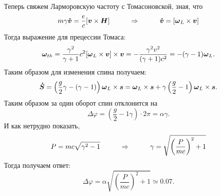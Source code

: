 Теперь свяжем Ларморовскую частоту с Томасоновской, зная, что 
\begin{equation*}
	m \gamma \mbox{\boldmath $\dot{v}$} = \frac{e}{c} [\mbox{\boldmath $v$} \times \mbox{\boldmath $H$}]
	\hspace{1 cm}
	\Rightarrow
	\hspace{1 cm}
	\mbox{\boldmath $\dot{v}$} = [\mbox{\boldmath $\omega$}_L \times \mbox{\boldmath $v$}]
\end{equation*}
Тогда выражение для прецессии Томаса:
\begin{equation*}
	\mbox{\boldmath $\omega$}_{th} = \frac{\gamma^2}{\gamma +1}c^2 [\mbox{\boldmath $\omega$}_L \times \mbox{\boldmath $v$}]\times \mbox{\boldmath $v$} = - \frac{\gamma^2 v^2}{(\gamma+1) c^2} = - (\gamma - 1) \mbox{\boldmath $\omega$}_L.
\end{equation*}
Таким образом для изменения спина получаем:
\begin{equation*}
	\mbox{\boldmath $\dot{S}$} = \left(\frac{g}{2}\gamma - (\gamma - 1)\right) \mbox{\boldmath $\omega$}_L \times \mbox{\boldmath $s$} = \mbox{\boldmath $\omega$}_L \times \mbox{\boldmath $s$} + \gamma \left(\frac{g}{2} - 1\right)\mbox{\boldmath $\omega$}_L \times \mbox{\boldmath $s$}.
\end{equation*}
Таким образом за один оборот спин отклонится на
\begin{equation*}
	\Delta \varphi =  \left(\frac{g}{2} - 1 \gamma\right) \cdot 2 \pi = \alpha \gamma.
\end{equation*}
И как нетрудно показать, 
\begin{equation*}
	P = m c \sqrt{\gamma^2 - 1}
	\hspace{1 cm}
	\Rightarrow
	\hspace{1 cm}
	\gamma = \sqrt{\left(\frac{P}{m c}\right)^2 + 1}
\end{equation*}
Тогда получаем ответ:
\begin{equation*}
	\Delta \varphi = \alpha \sqrt{\left(\frac{P}{m c}\right)^2 + 1} \simeq 0.07.
\end{equation*}